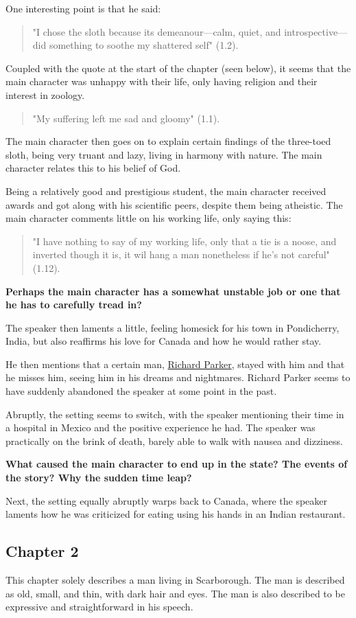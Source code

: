 \documentclass[11pt]{article}
\begin{document}
One interesting point is that he said:
\begin{quote}
"I chose the sloth because its demeanour---calm, quiet, and introspective---did something to soothe my shattered self" (1.2).
\end{quote}
Coupled with the quote at the start of the chapter (seen below), it seems that the main character was unhappy with their life, only having religion and their interest in zoology.
\begin{quote}
"My suffering left me sad and gloomy" (1.1).
\end{quote}
The main character then goes on to explain certain findings of the three-toed sloth, being very truant and lazy, living in harmony with nature. The main character relates this to his belief of God.

Being a relatively good and prestigious student, the main character received awards and got along with his scientific peers, despite them being atheistic.
The main character comments little on his working life, only saying this:
\begin{quote}
"I have nothing to say of my working life, only that a tie is a noose, and inverted though it is, it wil hang a man nonetheless if he's not careful" (1.12).
\end{quote}
\textbf{Perhaps the main character has a somewhat unstable job or one that he has to carefully tread in?}

The speaker then laments a little, feeling homesick for his town in Pondicherry, India, but also reaffirms his love for Canada and how he would rather stay.

He then mentions that a certain man, \uline{Richard Parker}, stayed with him and that he misses him, seeing him in his dreams and nightmares. Richard Parker seems to have suddenly abandoned the speaker at some point in the past.

Abruptly, the setting seems to switch, with the speaker mentioning their time in a hospital in Mexico and the positive experience he had. The speaker was practically on the brink of death, barely able to walk with nausea and dizziness.

\textbf{What caused the main character to end up in the state? The events of the story? Why the sudden time leap?}

Next, the setting equally abruptly warps back to Canada, where the speaker laments how he was criticized for eating using his hands in an Indian restaurant.
\subsection{Chapter 2}
\label{sec:orgc81ea96}
This chapter solely describes a man living in Scarborough. The man is described as old, small, and thin, with dark hair and eyes. The man is also described to be expressive and straightforward in his speech.
\end{document}
